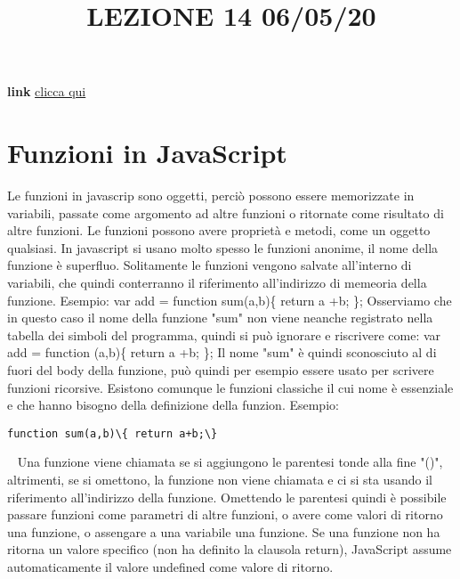 \title{LEZIONE 14 06/05/20}
\textbf{link} \href{https://web.microsoftstream.com/video/1f9e0781-7149-4a62-851d-de458cb09274?list=user&userId=cfe0965d-9a7c-40e2-be6e-f078296a1914}{clicca qui}
\section{Funzioni in JavaScript}
Le funzioni in javascrip sono oggetti, perciò possono essere memorizzate in variabili, passate come argomento ad altre funzioni o ritornate come risultato di altre funzioni. Le funzioni possono avere proprietà e metodi, come un oggetto qualsiasi.\newline
\newline
In javascript si usano molto spesso le funzioni anonime, il nome della funzione è superfluo. Solitamente le funzioni vengono salvate all'interno di variabili, che quindi conterranno il riferimento all'indirizzo di memeoria della funzione.\newline
Esempio:\newline
var add = function sum(a,b)\{ return a +b; \};\newline
Osserviamo che in questo caso il nome della funzione "sum" non viene neanche registrato nella tabella dei simboli del programma, quindi si può ignorare e riscrivere come:\newline
var add = function (a,b)\{ return a +b; \};\newline
Il nome "sum" è quindi sconosciuto al di fuori del body della funzione, può quindi per esempio essere usato per scrivere funzioni ricorsive.\newline
\newline
Esistono comunque le funzioni classiche il cui nome è essenziale e che hanno bisogno della definizione della funzion.\newline
Esempio:
\begin{lstlisting}
function sum(a,b)\{ return a+b;\}
\end{lstlisting}
\ \newline
Una funzione viene chiamata se si aggiungono le parentesi tonde alla fine "()", altrimenti, se si omettono, la funzione non viene chiamata e ci si sta usando il riferimento all'indirizzo della funzione. Omettendo le parentesi quindi è possibile passare funzioni come parametri di altre funzioni, o avere come valori di ritorno una funzione, o assengare a una variabile una funzione.\newline
\newline
Se una funzione non ha ritorna un valore specifico (non ha definito la clausola return), JavaScript assume automaticamente il valore undefined come valore di ritorno.\newline
